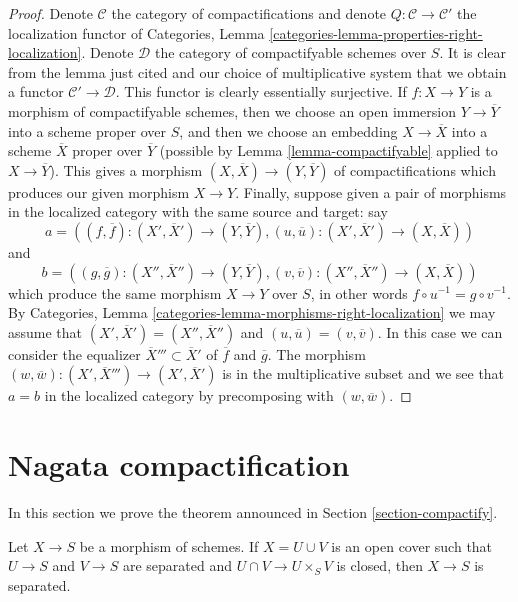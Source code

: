 \begin{proof}
Denote $\mathcal{C}$ the category of compactifications and
denote $Q : \mathcal{C} \to \mathcal{C}'$ the localization
functor of Categories, Lemma
\ref{categories-lemma-properties-right-localization}.
Denote $\mathcal{D}$ the category of compactifyable schemes
over $S$. It is clear from the lemma just cited and our
choice of multiplicative system that we
obtain a functor $\mathcal{C}' \to \mathcal{D}$.
This functor is clearly essentially surjective.
If $f : X \to Y$ is a morphism of compactifyable
schemes, then we choose an open immersion $Y \to \overline{Y}$
into a scheme proper over $S$, and then we choose an embedding
$X \to \overline{X}$ into a scheme $\overline{X}$ proper over
$\overline{Y}$ (possible by Lemma \ref{lemma-compactifyable}
applied to $X \to \overline{Y}$). This gives a morphism
$(X, \overline{X}) \to (Y, \overline{Y})$ of compactifications
which produces our given morphism $X \to Y$.
Finally, suppose given a pair of morphisms in the
localized category with the same source and target: say
$$
a = ((f, \overline{f}) : (X', \overline{X}') \to (Y, \overline{Y}),
(u, \overline{u}) : (X', \overline{X}') \to (X, \overline{X}))
$$
and
$$
b = ((g, \overline{g}) : (X'', \overline{X}'') \to (Y, \overline{Y}),
(v, \overline{v}) : (X'', \overline{X}'') \to (X, \overline{X}))
$$
which produce the same morphism $X \to Y$ over $S$, in other words
$f \circ u^{-1} = g \circ v^{-1}$. By
Categories, Lemma \ref{categories-lemma-morphisms-right-localization}
we may assume that $(X', \overline{X}') = (X'', \overline{X}'')$
and $(u, \overline{u}) = (v, \overline{v})$. In this case we
can consider the equalizer $\overline{X}''' \subset \overline{X}'$
of $\overline{f}$ and $\overline{g}$. The morphism
$(w, \overline{w}) : (X', \overline{X}''') \to (X', \overline{X}')$ is in
the multiplicative subset and we see that $a = b$ in the localized
category by precomposing with $(w, \overline{w})$.
\end{proof}






\section{Nagata compactification}
\label{section-compactifications}

\noindent
In this section we prove the theorem announced in
Section \ref{section-compactify}.

\begin{lemma}
\label{lemma-check-separated}
Let $X \to S$ be a morphism of schemes. If $X = U \cup V$
is an open cover such that $U \to S$ and $V \to S$ are separated
and $U \cap V \to U \times_S V$ is closed, then
$X \to S$ is separated.
\end{lemma}

